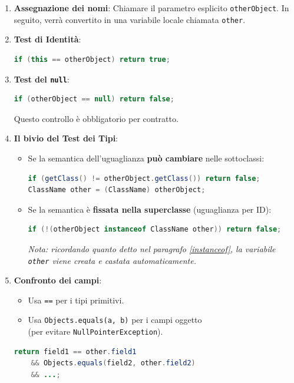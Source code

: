 \begin{enumerate}
    \item \textbf{Assegnazione dei nomi}: Chiamare il parametro esplicito \texttt{otherObject}. In seguito, verrà convertito in una variabile locale chiamata \texttt{other}.
    
    \item \textbf{Test di Identità}:
    \begin{lstlisting}[language=Java]
if (this == otherObject) return true;
    \end{lstlisting}

    \item \textbf{Test del \texttt{null}}:
    \begin{lstlisting}[language=Java]
if (otherObject == null) return false;
    \end{lstlisting}
    Questo controllo è obbligatorio per contratto.

    \item \textbf{Il bivio del Test dei Tipi}:
    \begin{itemize}
        \item Se la semantica dell'uguaglianza \textbf{può cambiare} nelle sottoclassi:
        \begin{lstlisting}[language=Java]
if (getClass() != otherObject.getClass()) return false;
ClassName other = (ClassName) otherObject;
        \end{lstlisting}
        \item Se la semantica è \textbf{fissata nella superclasse} (uguaglianza per ID):
        \begin{lstlisting}[language=Java]
if (!(otherObject instanceof ClassName other)) return false;
        \end{lstlisting}
        \textit{Nota: ricordando quanto detto nel paragrafo \ref{instanceof}, la variabile \texttt{other} viene creata e castata automaticamente.}
    \end{itemize}

    \item \textbf{Confronto dei campi}:
    \begin{itemize}
        \item Usa \texttt{==} per i tipi primitivi.
        \item Usa \texttt{Objects.equals(a, b)} per i campi oggetto \\ (per evitare \texttt{NullPointerException}).
    \end{itemize}
    \begin{lstlisting}[language=Java]
return field1 == other.field1 
    && Objects.equals(field2, other.field2) 
    && ...;
    \end{lstlisting}
\end{enumerate}

